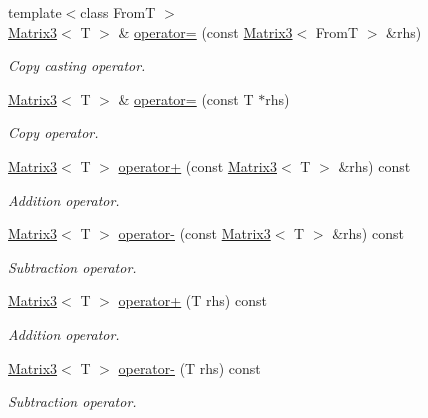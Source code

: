 \begin{DoxyCompactItemize}
{\footnotesize template$<$class FromT $>$ }\\\hyperlink{class_matrix3}{Matrix3}$<$ T $>$ \& \hyperlink{class_matrix3_a8fc1aae99bf569de84249e8716ce50e8}{operator=} (const \hyperlink{class_matrix3}{Matrix3}$<$ FromT $>$ \&rhs)
\begin{DoxyCompactList}\small\item\em Copy casting operator. \item\end{DoxyCompactList}\item 
\hyperlink{class_matrix3}{Matrix3}$<$ T $>$ \& \hyperlink{class_matrix3_a0c34f193be3802cae81c4cbfdfab1a53}{operator=} (const T $\ast$rhs)
\begin{DoxyCompactList}\small\item\em Copy operator. \item\end{DoxyCompactList}\item 
\hyperlink{class_matrix3}{Matrix3}$<$ T $>$ \hyperlink{class_matrix3_ad960991a64a1e6c72e21c29fb8c1f890}{operator+} (const \hyperlink{class_matrix3}{Matrix3}$<$ T $>$ \&rhs) const 
\begin{DoxyCompactList}\small\item\em Addition operator. \item\end{DoxyCompactList}\item 
\hyperlink{class_matrix3}{Matrix3}$<$ T $>$ \hyperlink{class_matrix3_aeb5ca229fa633ceec14fc93fa873234d}{operator-\/} (const \hyperlink{class_matrix3}{Matrix3}$<$ T $>$ \&rhs) const 
\begin{DoxyCompactList}\small\item\em Subtraction operator. \item\end{DoxyCompactList}\item 
\hyperlink{class_matrix3}{Matrix3}$<$ T $>$ \hyperlink{class_matrix3_a635803865b0b5c3c0e2102a44d7ed5d8}{operator+} (T rhs) const 
\begin{DoxyCompactList}\small\item\em Addition operator. \item\end{DoxyCompactList}\item 
\hyperlink{class_matrix3}{Matrix3}$<$ T $>$ \hyperlink{class_matrix3_a708ee4b7775f551c63e1d1820ef1d7b2}{operator-\/} (T rhs) const 
\begin{DoxyCompactList}\small\item\em Subtraction operator. \item\end{DoxyCompactList}\item 

\end{DoxyCompactItemize}
